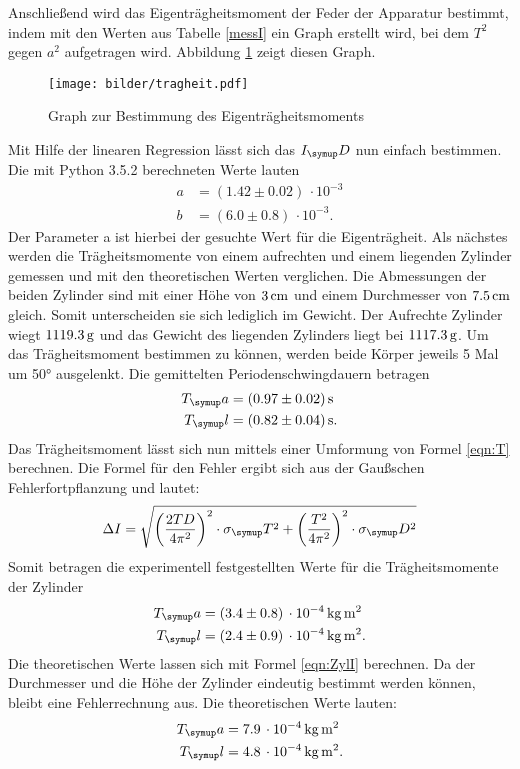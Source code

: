 Anschließend wird das Eigenträgheitsmoment der Feder der Apparatur bestimmt,
indem mit den Werten aus Tabelle \ref{messI} ein Graph erstellt wird, bei dem
$T^2$ gegen $a^2$ aufgetragen wird. Abbildung \ref{fig:trag} zeigt diesen Graph.
\begin{figure}[H]
  \centering
  \texttt{[image: bilder/tragheit.pdf]}
  \caption{Graph zur Bestimmung des Eigenträgheitsmoments}
  \label{fig:trag}
\end{figure}
Mit Hilfe der linearen Regression lässt sich das $I_\su{D}$ nun einfach bestimmen.
Die mit Python 3.5.2 berechneten Werte lauten
\begin{align*}
  a &= (1.42 \pm 0.02)\,\cdot10^{-3} \\
  b &= (6.0 \pm 0.8)\,\cdot10^{-3}.
\end{align*}
Der Parameter a ist hierbei der gesuchte Wert für die Eigenträgheit.
Als nächstes werden die Trägheitsmomente von einem aufrechten und einem liegenden
Zylinder gemessen und mit den theoretischen Werten verglichen. Die Abmessungen
der beiden Zylinder sind mit einer Höhe von $3\,\si{\centi\meter}$ und einem Durchmesser von $7.5\,\si{\centi\meter}$
gleich. Somit unterscheiden sie sich lediglich im Gewicht. Der Aufrechte Zylinder
wiegt $1119.3\,\si{\gram}$ und das Gewicht des liegenden Zylinders liegt bei $1117.3\,\si{\gram}$.
Um das Trägheitsmoment bestimmen zu können, werden beide Körper jeweils 5 Mal um
50° ausgelenkt. Die gemittelten Periodenschwingdauern betragen
\begin{align*}
  T_\su{a} &= (0.97 \pm 0.02)\sek \\
  T_\su{l} &= (0.82 \pm 0.04)\sek.
\end{align*}
Das Trägheitsmoment lässt sich nun mittels einer Umformung von Formel \eqref{eqn:T}
berechnen. Die Formel für den Fehler ergibt sich aus der Gaußschen Fehlerfortpflanzung
und lautet:
\begin{equation*}
  \Delta I = \sqrt{\biggl(\frac{2TD}{4\pi^2}\biggr)^2\cdot\sigma_\su{T}^2 +
  \biggl(\frac{T^2}{4\pi^2}\biggr)^2\cdot\sigma_\su{D}^2}
\end{equation*}
Somit betragen die experimentell festgestellten Werte für die Trägheitsmomente
der Zylinder
\begin{align*}
  T_\su{a} &= (3.4 \pm 0.8)\,\cdot10^{-4}\,\si{\kilo\gram\square\meter} \\
  T_\su{l} &= (2.4 \pm 0.9)\,\cdot10^{-4}\,\si{\kilo\gram\square\meter}.
\end{align*}
Die theoretischen Werte lassen sich mit Formel \eqref{eqn:ZylI} berechnen.
Da der Durchmesser und die Höhe der Zylinder eindeutig bestimmt werden können,
bleibt eine Fehlerrechnung aus.
Die theoretischen Werte lauten:
\begin{align}
  T_\su{a} &= 7.9\,\cdot10^{-4}\,\si{\kilo\gram\square\meter} \\
  T_\su{l} &= 4.8\,\cdot10^{-4}\,\si{\kilo\gram\square\meter}.
\end{align}
